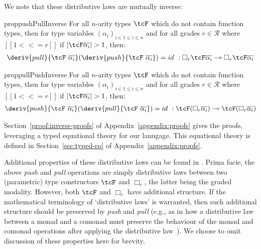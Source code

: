We note that these distributive laws are mutually inverse:

\begin{restatable}{prop}{pushPullInverse}
  For all $n$-arity types $\tcF$ which do not contain function types,
  then for type variables $(\alpha_i)_{i \in 1 \leq i \leq n}$
  and for all grades $r \in \mathcal{R}$ where $[[1 <<= r]]$ if $|\tcF
    \overline{\alpha_i}| > 1$, then:
  \begin{align*}
\deriv{pull}{\tcF\
  \overline{\alpha_i}}(\deriv{push}{\tcF\
  \overline{\alpha_i}}) = id\ : \Box_{r} \tcF \overline{\alpha_i}
\multimap \Box_{r} \tcF \overline{\alpha_i}
    \end{align*}
\end{restatable}

\begin{restatable}{prop}{pullPushInverse}
  For all $n$-arity types $\tcF$ which do not contain function types,
  then for type variables $(\alpha_i)_{i \in 1 \leq i \leq n}$
  and for all grades $r \in \mathcal{R}$ where $[[1 <<= r]]$ if $|\tcF
    \overline{\alpha_i}| > 1$, then:
  \begin{align*}
\deriv{push}{\tcF\
  \overline{\alpha_i}}(\deriv{pull}{\tcF\
  \overline{\alpha_i}}) = id\ : \tcF (\Box_{r} \overline{\alpha_i})
\multimap \tcF (\Box_{r} \overline{\alpha_i})
    \end{align*}
  \end{restatable}

\noindent
Section~\ref{proof:inverse-proofs} of Appendix~\ref{appendix:proofs} gives the
proofs, leveraging a typed equational theory for our lanugage. This equational
theory is defined in Section~\ref{sec:typed-eq} of
Appendix~\ref{appendix:proofs}.

Additional properties of these distributive laws can be found in
\citet{DBLP:journals/corr/abs-2112-14966}. Prima facie, the above \emph{push}
and \emph{pull} operations are simply distributive laws between two (parametric)
type constructors $\tcF$ and $\Box_r$, the latter being the graded modality.
However, both $\tcF$ and $\Box_r$ have additional structure. If the mathematical
terminology of `distributive laws' is warranted, then such additional structure
should be preserved by \emph{push} and \emph{pull} (e.g., as in how a
distributive law between a monad and a comonad must preserve the behaviour of
the monad and comonad operations after applying the distributive
law~\citep{power2002combining}). We choose to omit discussion of these
properties here for brevity. 

